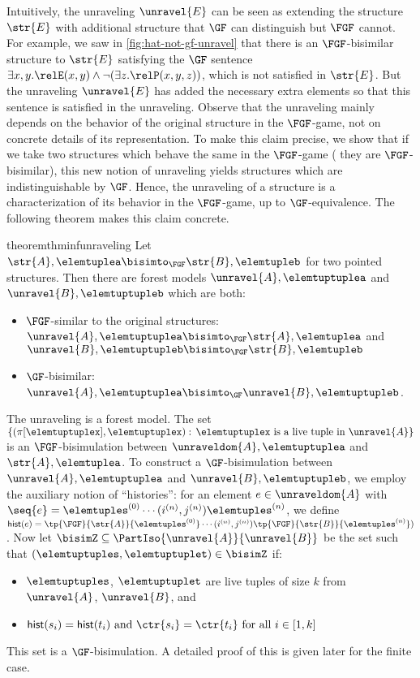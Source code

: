 Intuitively, the unraveling $\unravel{E}$ can be seen as extending the structure $\str{E}$ with additional structure that $\GF$ can distinguish but $\FGF$ cannot.
For example, we saw in \cref{fig:hat-not-gf-unravel} that there is an $\FGF$-bisimilar structure to $\str{E}$ satisfying the $\GF$ sentence $\exists{x,y}. \relE(x,y) \land \lnot (\exists z. \relP(x,y,z))$, which is not satisfied in $\str{E}$.
But the unraveling $\unravel{E}$ has added the necessary extra elements so that this sentence is satisfied in the unraveling.
Observe that the unraveling mainly depends on the behavior of the original structure in the $\FGF$-game, not on concrete details of its representation.
To make this claim precise, we show that if we take two structures which behave the same in the $\FGF$-game (\ie{} they are $\FGF$-bisimilar), this new notion of unraveling yields structures which are indistinguishable by $\GF$.
Hence, the unraveling of a structure is a characterization of its behavior in the $\FGF$-game, up to $\GF$-equivalence. The following theorem makes this claim concrete.
\begin{restatable}{theorem}{thminfunraveling}\label{thm:inf-unraveling-upgrading}
  Let $\str{A}, \elemtuplea \bisimto_{\FGF} \str{B}, \elemtupleb$ for two pointed structures.
  Then there are forest models $\unravel{A}, \elemtuptuplea$ and $\unravel{B}, \elemtuptupleb$ which are both:
  \begin{itemize}
    \item $\FGF$-similar to the original structures: $\unravel{A}, \elemtuptuplea \bisimto_{\FGF} \str{A}, \elemtuplea$ and $\unravel{B}, \elemtuptupleb \bisimto_{\FGF} \str{B}, \elemtupleb$
    \item $\GF$-bisimilar: $\unravel{A}, \elemtuptuplea \bisimto_{\GF} \unravel{B}, \elemtuptupleb$.
  \end{itemize}
\end{restatable}
\begin{proofsketch}
  The unraveling is a forest model.
  The set $\{(\pi[\elemtuptuplex], \elemtuptuplex):\, \elemtuptuplex\ \text{is a live tuple in}\ \unravel{A} \}$ is an $\FGF$-bisimulation between $\unraveldom{A}, \elemtuptuplea$ and $\str{A}, \elemtuplea$.
  To construct a $\GF$-bisimulation between $\unravel{A}, \elemtuptuplea$ and $\unravel{B}, \elemtuptupleb$, we employ the auxiliary notion of ``histories'': for an element $e \in \unraveldom{A}$ with $\seq{e} = \elemtuples^{(0)}\cdots(i^{(n)}, j^{(n)})\elemtuples^{(n)}$, we define $\mathsf{hist}(e) = \tp{\FGF}{\str{A}}{\elemtuples^{(0)}} \cdots (i^{(n)}, j^{(n)}) \tp{\FGF}{\str{B}}{\elemtuples^{(n)}})$.
  Now let $\bisimZ \subseteq \PartIso{\unravel{A}}{\unravel{B}}$ be the set such that $(\elemtuptuples, \elemtuptuplet) \in \bisimZ$ if:
  \begin{itemize}
    \item $\elemtuptuples$, $\elemtuptuplet$ are live tuples of size $k$ from $\unravel{A}$, $\unravel{B}$, and
    \item $\mathsf{hist}(s_{i}) = \mathsf{hist}(t_{i})\text{ and }\ctr{s_{i}} = \ctr{t_{i}}\text{ for all }i \in [1, k]$
  \end{itemize}
  This set is a $\GF$-bisimulation.
  A detailed proof of this is given later for the finite case.
\end{proofsketch}
